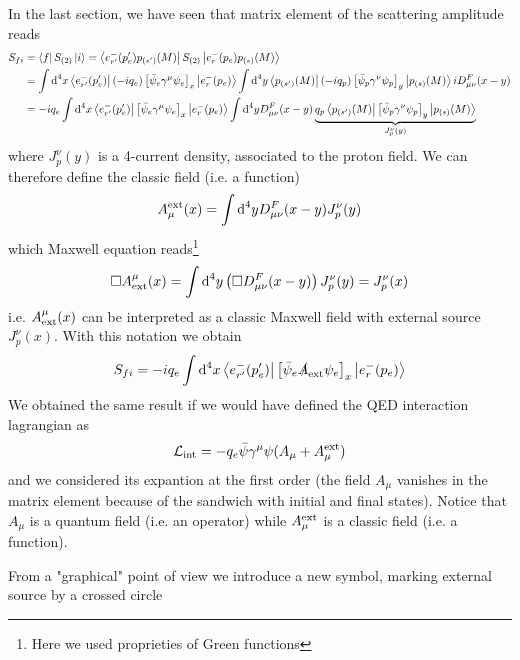 \documentclass[TheoreticalPhy_ModB.tex]{subfiles}
\begin{document}
In the last section, we have seen that matrix element of the scattering amplitude reads
\begin{align*}
S_{fi}&=\bra f S_{(2)}\ket i=\bra{e_{r'}^-(p_e')p_{(s')}(M)}S_{(2)}\ket{e_{r}^-(p_e)p_{(s)}(M)}\\
&=\int\textup{d}^4x\bra{e_{r'}^-(p_e')}(-iq_e)\left[\bar\psi_e\gamma^\mu\psi_e\right]_x\ket{e_{r}^-(p_e)}
\int\textup{d}^4y\bra{p_{(s')}(M)}(-iq_p)\left[\bar\psi_p\gamma^\nu\psi_p\right]_y\ket{p_{(s)}(M)}
iD_{\mu\nu}^F(x-y)\\
&=-iq_e\int\textup{d}^4x\bra{e_{r'}^-(p_e')}\left[\bar\psi_e\gamma^\mu\psi_e\right]_x\ket{e_{r}^-(p_e)}
\int\textup{d}^4yD_{\mu\nu}^F(x-y)\underbrace{q_p\bra{p_{(s')}(M)}\left[\bar\psi_p\gamma^\nu\psi_p\right]_y\ket{p_{(s)}(M)}}_{J^\nu_p(y)}
\end{align*}
where $J^\nu_p(y)$ is a 4-current density, associated to the proton field. We can therefore define the classic field (i.e. a function)
\[A^{\textup{ext}}_\mu(x)=\int\textup{d}^4yD_{\mu\nu}^F(x-y)J^\nu_p(y)
\]
which Maxwell equation reads\footnote{Here we used proprieties of Green functions}
\[ \square A_{\textup{ext}}^\mu(x)=\int\textup{d}^4y\left(\square D_{\mu\nu}^F(x-y)\right)J^\nu_p(y)=J^\nu_p(x)\]
i.e. $A_{\textup{ext}}^\mu(x)$ can be interpreted as a classic Maxwell field with external source $J^\nu_p(x)$.
With this notation we obtain
\[S_{fi}=-iq_e\int\textup{d}^4x\bra{e_{r'}^-(p_e')}\left[\bar\psi_e\slashed A_{\textup{ext}}\psi_e\right]_x\ket{e_{r}^-(p_e)}\]
We obtained the same result if we would have defined the QED interaction lagrangian as
\[\mathcal L_{\textup{int}}=-q_e\bar\psi\gamma^\mu\psi(A_\mu+A^{\textup{ext}}_\mu)\]
and we considered its expantion at the first order (the field $A_\mu$ vanishes in the matrix element because of the sandwich  with initial and final states). Notice that $A_\mu$ is a quantum field (i.e. an operator) while $A^{\textup{ext}}_\mu$ is a classic field (i.e. a function).

From a "graphical" point of view we introduce a new symbol, marking external source by a crossed circle

\begin{figure}[H]
\centering
{}
\end{figure}
\end{document}
